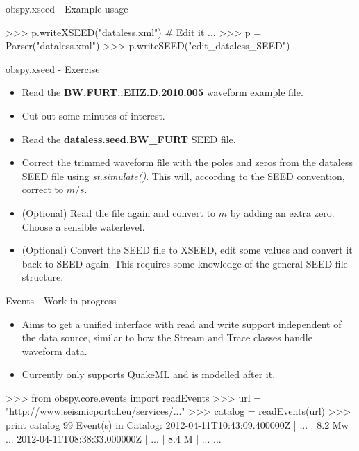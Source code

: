 \begin{frame}{obspy.xseed - Example usage}
\begin{myColorBox}{0.95}{}
\begin{python}
>>> p.writeXSEED("dataless.xml")
# Edit it ...
>>> p = Parser("dataless.xml")
>>> p.writeSEED("edit_dataless_SEED")
\end{python}
\end{myColorBox}
\end{frame}


\begin{frame}{obspy.xseed - Exercise}
    \begin{itemize}
        \item Read the \textbf{BW.FURT..EHZ.D.2010.005} waveform example file.
        \item Cut out some minutes of interest.
        \item Read the \textbf{dataless.seed.BW\_FURT} SEED file.
        \item Correct the trimmed waveform file with the poles and zeros from
            the dataless SEED file using \textit{st.simulate()}. This will,
            according to the SEED convention, correct to $m/s$.
        \item (Optional) Read the file again and convert to $m$ by adding an
            extra zero. Choose a sensible waterlevel.
        \item (Optional) Convert the SEED file to XSEED, edit some values and
            convert it back to SEED again. This requires some knowledge of the
            general SEED file structure.
    \end{itemize}
\end{frame}


\begin{frame}{Events - Work in progress}
    \begin{itemize}
        \item Aims to get a unified interface with read and write support independent of the data source, similar to how the Stream and Trace classes handle waveform data.
        \item Currently only supports QuakeML and is modelled after it.
    \end{itemize}
\begin{myColorBox}{0.95}{}
\begin{python}
>>> from obspy.core.events import readEvents
>>> url = "http://www.seismicportal.eu/services/..."
>>> catalog = readEvents(url)
>>> print catalog
99 Event(s) in Catalog:
2012-04-11T10:43:09.400000Z |  ... | 8.2 Mw | ...
2012-04-11T08:38:33.000000Z |  ... | 8.4 M  | ...
...
\end{python}
\end{myColorBox}
\end{frame}

